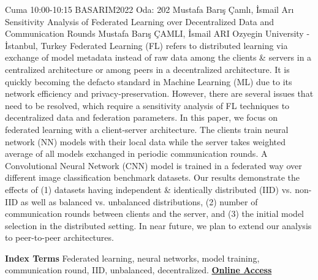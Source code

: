 
    \begin{abstract_basarim}
    {Cuma 10:00-10:15}
    {BASARIM2022}
    {Oda: 202}
    {Mustafa Barış Çamlı, İsmail Arı}
    {Sensitivity Analysis of Federated Learning over Decentralized Data and Communication Rounds}
    {%
    Mustafa Barış ÇAMLI, İsmail ARI}
    {%
    }
    {%
    Ozyegin University - İstanbul, Turkey}
    Federated Learning (FL) refers to distributed learning via exchange of model metadata instead of raw data among the clients & servers in a centralized architecture or among peers in a decentralized architecture. It is quickly becoming the defacto standard in Machine Learning (ML) due to its network efficiency and privacy-preservation. However, there are several issues that need to be resolved, which require a sensitivity analysis of FL techniques to decentralized data and federation parameters. In this paper, we focus on federated learning with a client-server architecture. The clients train neural network (NN) models with their local data while the server takes weighted average of all models exchanged in periodic communication rounds. A Convolutional Neural Network (CNN) model is trained in a federated way over different image classification benchmark datasets. Our results demonstrate the effects of (1) datasets having independent & identically distributed (IID) vs. non-IID as well as balanced vs. unbalanced distributions, (2) number of communication rounds between clients and the server, and (3) the initial model selection in the distributed setting. In near future, we plan to extend our analysis to peer-to-peer architectures. 
    
            \textbf{Index Terms} \newline{}Federated learning, neural networks, model training, communication round, IID, unbalanced, decentralized.
     \newline\newline\noindent \href{https://drive.google.com/file/d/1BAjBhdrIpJDFjwmGLf1MDHhema0RfbJX/view?usp=drivesdk}{\bfseries Online Access}
    \end{abstract_basarim}
    